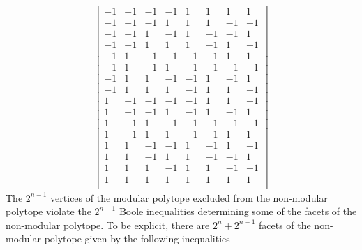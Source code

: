 \begin{equation}
\begin{aligned}\label{eq:nonmodvertexp}
\begin{bmatrix}
  -1 & -1 & -1 & -1 & 1 & 1 & 1 & 1\\
  -1 & -1 & -1 & 1 & 1 & 1 & -1 & -1\\
  -1 & -1 & 1 & -1 & 1 & -1 & -1 & 1\\
  -1 & -1 & 1 & 1 & 1 & -1 & 1 & -1\\
  -1 & 1 & -1 & -1 & -1 & -1 & 1 & 1\\
  -1 & 1 & -1 & 1 & -1 & -1 & -1 & -1\\
  -1 & 1 & 1 & -1 & -1 & 1 & -1 & 1\\
  -1 & 1 & 1 & 1 & -1 & 1 & 1 & -1\\
  1 & -1 & -1 & -1 & -1 & 1 & 1 & -1\\
  1 & -1 & -1 & 1 & -1 & 1 & -1 & 1\\
  1 & -1 & 1 & -1 & -1 & -1 & -1 & -1\\
  1 & -1 & 1 & 1 & -1 & -1 & 1 & 1\\
  1 & 1 & -1 & -1 & 1 & -1 & 1 & -1\\
  1 & 1 & -1 & 1 & 1 & -1 & -1 & 1\\
  1 & 1 & 1 & -1 & 1 & 1 & -1 & -1\\
  1 & 1 & 1 & 1 & 1 & 1 & 1 & 1\\
\end{bmatrix}
\end{aligned}
\end{equation}
The $2^{n-1}$ vertices of the modular polytope excluded from the non-modular polytope violate the $2^{n-1}$ Boole inequalities determining some of the facets of the non-modular polytope. To be explicit, there are $2^n + 2^{n-1}$ facets of the non-modular polytope given by the following inequalities
